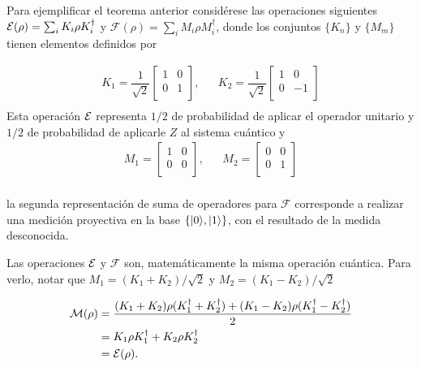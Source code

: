 Para ejemplificar el teorema anterior  considérese las operaciones siguientes $\mathcal{E}(\rho)=\sum_i K_i\rho K_i^\dagger$ y $\mathcal{F}(\rho)=\sum_i M_i\rho M_i^\dagger$, donde los conjuntos $\{K_n\}$ y $\{M_m\}$ tienen elementos definidos por 

\begin{equation}
    \begin{array}{ccc}
        K_1=\dfrac{1}{\sqrt{2}}\begin{bmatrix}
            1&0\\
            0&1\\
        \end{bmatrix},&&K_2=\dfrac{1}{\sqrt{2}}\begin{bmatrix}
            1&0\\
            0&-1\\
        \end{bmatrix}\\
    \end{array}
\end{equation}
Esta operación $\mathcal{E}$ representa $1/2$ de probabilidad de aplicar el operador unitario y $1/2$ de probabilidad de aplicarle $Z$ al sistema cuántico y
\begin{equation}
    \begin{array}{ccc}
        M_1=\begin{bmatrix}
            1&0\\
            0&0\\
        \end{bmatrix},&&M_2=\begin{bmatrix}
            0&0\\
            0&1\\
        \end{bmatrix}\\
    \end{array}
\end{equation}

la segunda representación de suma de operadores para $\mathcal{F}$ corresponde a realizar una medición proyectiva en la base $\{|0\rangle , |1\rangle\}$, con el resultado de la medida desconocida. 



Las operaciones $\mathcal{E}$ y $\mathcal{F}$ son, matemáticamente la misma operación cuántica. Para verlo, notar que $M_1=(K_1+K_2)/\sqrt{2}$ y $M_2=(K_1-K_2)/\sqrt{2}$

\begin{equation}
    \begin{split}
        \mathcal{M}(\rho)&=\dfrac{(K_1+K_2)\rho(K_1^\dagger+K_2^\dagger)+(K_1-K_2)\rho(K_1^\dagger-K_2^\dagger)}{2}\\
        &=K_1\rho K_1^\dagger+K_2\rho K_2^\dagger\\
        &=\mathcal{E}(\rho).
    \end{split}
\end{equation}


